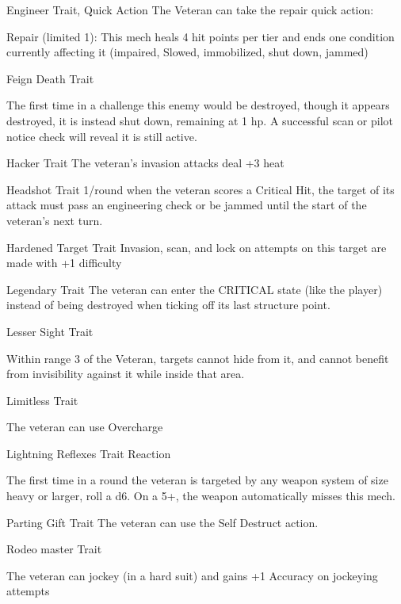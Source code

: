 Engineer  
Trait, Quick Action  
The Veteran can take the repair quick action:
 
         Repair (limited 1): This mech heals 4 hit points per tier and ends one condition currently  
         affecting it (impaired, Slowed, immobilized, shut down, jammed)
 

Feign Death  
Trait  

                                                                                                                  


The first time in a challenge this enemy would be destroyed, though it appears destroyed, it is  
instead shut down, remaining at 1 hp. A successful scan or pilot notice check will reveal it is still  
active.
 

Hacker  
Trait  
The veteran’s invasion attacks deal +3 heat
 

Headshot  
Trait  
1/round when the veteran scores a Critical Hit, the target of its attack must pass an engineering  
check or be jammed until the start of the veteran’s next turn.
 

Hardened Target  
Trait  
Invasion, scan, and lock on attempts on this target are made with +1 difficulty
 

Legendary  
Trait  
The veteran can enter the CRITICAL state (like the player) instead of being destroyed when  
ticking off its last structure point.
 

Lesser Sight  
Trait
 
Within range 3 of the Veteran, targets cannot hide from it, and cannot benefit from invisibility  
against it while inside that area.
 

Limitless  
Trait
 
The veteran can use Overcharge
 

Lightning Reflexes  
Trait  
Reaction
 
The first time in a round the veteran is targeted by any weapon system of size heavy or larger, roll  
a d6. On a 5+, the weapon automatically misses this mech.
 

Parting Gift  
Trait  
The veteran can use the Self Destruct action.
 

Rodeo master  
Trait  

                                                                                                                     


The veteran can jockey (in a hard suit) and gains +1 Accuracy on jockeying attempts
 

